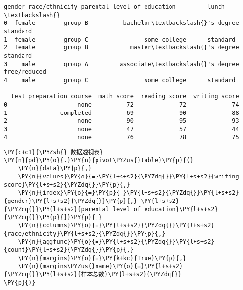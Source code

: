             \begin{tcolorbox}[breakable, size=fbox, boxrule=.5pt, pad at break*=1mm, opacityfill=0]
\begin{Verbatim}[commandchars=\\\{\}]
   gender race/ethnicity parental level of education         lunch  \textbackslash{}
0  female        group B          bachelor\textbackslash{}'s degree      standard
1  female        group C                some college      standard
2  female        group B            master\textbackslash{}'s degree      standard
3    male        group A         associate\textbackslash{}'s degree  free/reduced
4    male        group C                some college      standard

  test preparation course  math score  reading score  writing score
0                    none          72             72             74
1               completed          69             90             88
2                    none          90             95             93
3                    none          47             57             44
4                    none          76             78             75
\end{Verbatim}
\end{tcolorbox}
        
    \begin{tcolorbox}[breakable, size=fbox, boxrule=1pt, pad at break*=1mm,colback=cellbackground, colframe=cellborder]
\begin{Verbatim}[commandchars=\\\{\}]
\PY{c+c1}{\PYZsh{} 数据透视表}
\PY{n}{pd}\PY{o}{.}\PY{n}{pivot\PYZus{}table}\PY{p}{(}
    \PY{n}{data}\PY{p}{,}
    \PY{n}{values}\PY{o}{=}\PY{l+s+s2}{\PYZdq{}}\PY{l+s+s2}{writing score}\PY{l+s+s2}{\PYZdq{}}\PY{p}{,}
    \PY{n}{index}\PY{o}{=}\PY{p}{[}\PY{l+s+s2}{\PYZdq{}}\PY{l+s+s2}{gender}\PY{l+s+s2}{\PYZdq{}}\PY{p}{,} \PY{l+s+s2}{\PYZdq{}}\PY{l+s+s2}{parental level of education}\PY{l+s+s2}{\PYZdq{}}\PY{p}{]}\PY{p}{,}
    \PY{n}{columns}\PY{o}{=}\PY{l+s+s2}{\PYZdq{}}\PY{l+s+s2}{race/ethnicity}\PY{l+s+s2}{\PYZdq{}}\PY{p}{,}
    \PY{n}{aggfunc}\PY{o}{=}\PY{l+s+s2}{\PYZdq{}}\PY{l+s+s2}{count}\PY{l+s+s2}{\PYZdq{}}\PY{p}{,}
    \PY{n}{margins}\PY{o}{=}\PY{k+kc}{True}\PY{p}{,}
    \PY{n}{margins\PYZus{}name}\PY{o}{=}\PY{l+s+s2}{\PYZdq{}}\PY{l+s+s2}{样本总数}\PY{l+s+s2}{\PYZdq{}}
\PY{p}{)}
\end{Verbatim}
\end{tcolorbox}

